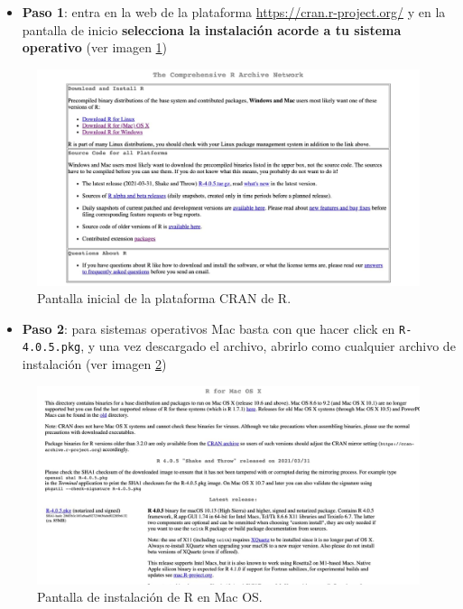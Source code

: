 \documentclass[11pt,]{book}
\providecommand{\tightlist}{%
  \setlength{\itemsep}{0pt}\setlength{\parskip}{0pt}}
\begin{document}
\begin{itemize}
\tightlist
\item
  \textbf{Paso 1}: entra en la web de la plataforma \url{https://cran.r-project.org/} y en la pantalla de inicio \textbf{selecciona la instalación acorde a tu sistema operativo} (ver imagen \ref{fig:pantalla-cran})
\end{itemize}

\begin{figure}

{\centering \includegraphics[width=0.75\linewidth]{./img/pantalla1_cran} 

}

\caption{Pantalla inicial de la plataforma CRAN de R.}\label{fig:pantalla-cran}
\end{figure}

\begin{itemize}
\tightlist
\item
  \textbf{Paso 2}: para sistemas operativos Mac basta con que hacer click en \texttt{R-4.0.5.pkg}, y una vez descargado el archivo, abrirlo como cualquier archivo de instalación (ver imagen \ref{fig:pantalla-mac})
\end{itemize}

\begin{figure}

{\centering \includegraphics[width=0.75\linewidth]{./img/pantall_mac_cran} 

}

\caption{Pantalla de instalación de R en Mac OS.}\label{fig:pantalla-mac}
\end{figure}
\end{document}
